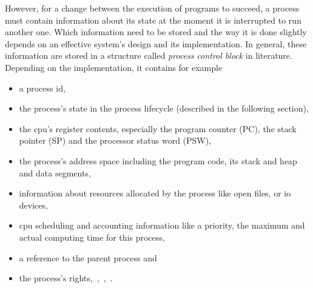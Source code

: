 However, for a change between the execution of programs to succeed, a process must contain information about its state at the moment it is interrupted to run another one.
Which information need to be stored and the way it is done slightly depends on an effective system's design and its implementation.
In general, these information are stored in a structure called \textit{process control block} in literature\cite{tanenbaum-modern-operating-systems}.
Depending on the implementation, it contains for example
\begin{itemize}
    \item a process id, 
    \item the process's state in the process lifecycle (described in the following section),
    \item the \ac{cpu}'s register contents, especially the program counter (PC), the stack pointer (SP) and the processor status word (PSW),
    \item the process's address space including the program code, its stack and heap and data segments, 
    \item information about resources allocated by the process like open files, or \ac{io} devices,
    \item \ac{cpu} scheduling and accounting information like a priority, the maximum and actual computing time for this process,
    \item a reference to the parent process and
    \item the process's rights\cite{tanenbaum-modern-operating-systems},~\cite{glatz2015betriebssysteme},~\cite{achilles2006betriebssysteme},~\cite{silberschatz2009operating}.
\end{itemize}


